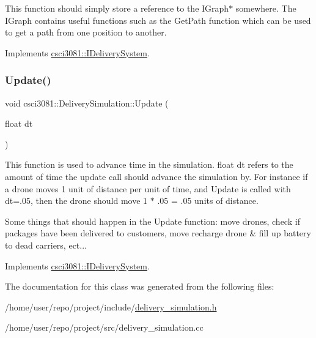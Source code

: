This function should simply store a reference to the I\+Graph$\ast$ somewhere. The I\+Graph contains useful functions such as the Get\+Path function which can be used to get a path from one position to another. 

Implements \hyperlink{classcsci3081_1_1IDeliverySystem_ac379454e54cc392ff7c24f565a3e8353}{csci3081\+::\+I\+Delivery\+System}.

\mbox{\label{classcsci3081_1_1DeliverySimulation_a537740cce3dc15c5ff8266580d1e8f13}} 
\subsubsection{\texorpdfstring{Update()}{Update()}}
{\footnotesize\ttfamily void csci3081\+::\+Delivery\+Simulation\+::\+Update (\begin{DoxyParamCaption}\item[{float}]{dt }\end{DoxyParamCaption})\hspace{0.3cm}{\ttfamily [virtual]}}

This function is used to advance time in the simulation. float dt refers to the amount of time the update call should advance the simulation by. For instance if a drone moves 1 unit of distance per unit of time, and Update is called with dt=.05, then the drone should move 1 $\ast$ .05 = .05 units of distance.

Some things that should happen in the Update function\+: move drones, check if packages have been delivered to customers, move recharge drone \& fill up battery to dead carriers, ect... 

Implements \hyperlink{classcsci3081_1_1IDeliverySystem_a3ef0dda19a6e1ad322bb6dd35ae3e3f1}{csci3081\+::\+I\+Delivery\+System}.



The documentation for this class was generated from the following files\+:\begin{DoxyCompactItemize}
\item 
/home/user/repo/project/include/\hyperlink{delivery__simulation_8h}{delivery\+\_\+simulation.\+h}\item 
/home/user/repo/project/src/delivery\+\_\+simulation.\+cc\end{DoxyCompactItemize}
